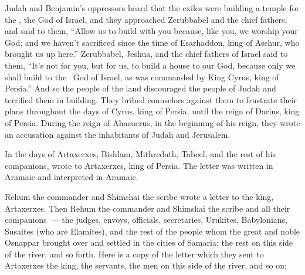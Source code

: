 
\begin{inparaenum}
   Judah and Benjamin's oppressors heard that the exiles were building a temple for the \lord, the God of Israel,%
   and they approached Zerubbabel and the chief fathers, and said to them, ``Allow us to build with you because, like you, we worship your God; and we haven't sacrificed since the time of Esarhaddon, king of Asshur, who brought us up here.''%
   Zerubbabel, Jeshua, and the chief fathers of Israel said to them, ``It's not for you, but for us, to build a house to our God, because only we shall build to the \lord\ God of Israel, as was commanded by King Cyrus, king of Persia.''%
   And so the people of the land discouraged the people of Judah and terrified them in building.%
   They bribed counselors against them to frustrate their plans throughout the days of Cyrus, king of Persia, until the reign of Darius, king of Persia.%
   During the reign of Ahasuerus, in the beginning of his reign, they wrote an accusation against the inhabitants of Judah and Jerusalem.%

   In the days of Artaxerxes, Bishlam, Mithredath, Tabeel, and the rest of his companions, wrote to Artaxerxes, king of Persia. The letter was written in Aramaic and interpreted in Aramaic.%

   Rehum the commander and Shimshai the scribe wrote a letter to the king, Artaxerxes.%
   Then Rehum the commander and Shimshai the scribe and all their companions~--- the judges, envoys, officials, secretaries, Urukites, Babylonians, Susaites (who are Elamites),%
   and the rest of the people whom the great and noble Osnappar brought over and settled in the cities of Samaria; the rest on this side of the river, and so forth.%
   Here is a copy of the letter which they sent to Artaxerxes the king, the servants, the men on this side of the river, and so on:%


\end{inparaenum}
